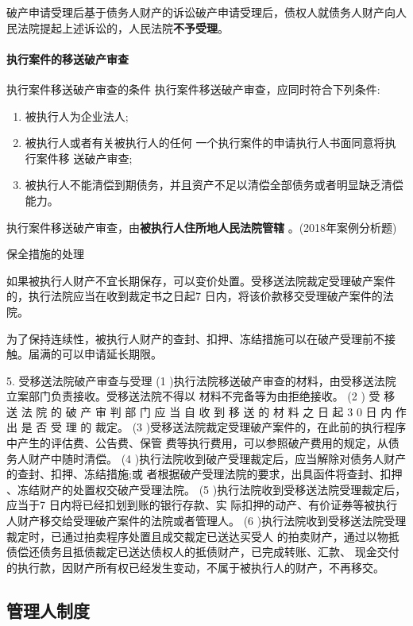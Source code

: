 \documentclass[UTF8,12pt]{ctexart}
\numberwithin{equation}{section} %
\numberwithin{figure}{section}
\numberwithin{table}{section}
\begin{document}
	破产申请受理后基于债务人财产的诉讼破产申请受理后，债权人就债务人财产向人民法院提起上述诉讼的，人民法院\textbf{不予受理}。
	
	\paragraph{执行案件的移送破产审查}
	执行案件移送破产审查的条件 执行案件移送破产审查，应同时符合下列条件:
	\begin{enumerate}
		\item 被执行人为企业法人;
		
		\item 被执行人或者有关被执行人的任何 一个执行案件的申请执行人书面同意将执行案件移 送破产审查;
		
		\item 被执行人不能清偿到期债务，并且资产不足以清偿全部债务或者明显缺乏清偿能力。 
	\end{enumerate}
	
	执行案件移送破产审查，由\textbf{被执行人住所地人民法院管辖} 。(2018年案例分析题)
	
	保全措施的处理
	
	如果被执行人财产不宜长期保存，可以变价处置。受移送法院裁定受理破产案件 的，执行法院应当在收到裁定书之日起7 日内，将该价款移交受理破产案件的法院。
	
	为了保持连续性，被执行人财产的查封、扣押、冻结措施可以在破产受理前不接触。届满的可以申请延长期限。 
	
	5. 受移送法院破产审查与受理
	(1 )执行法院移送破产审查的材料，由受移送法院立案部门负责接收。受移送法院不得以 材料不完备等为由拒绝接收。
	(2 ) 受 移 送 法 院 的 破 产 审 判 部 门 应 当 自 收 到 移 送 的 材 料 之 日 起 3 0 日 内 作 出 是 否 受 理 的
	裁定。
	(3 )受移送法院裁定受理破产案件的，在此前的执行程序中产生的评估费、公告费、保管 费等执行费用，可以参照破产费用的规定，从债务人财产中随时清偿。
	(4 )执行法院收到破产受理裁定后，应当解除对债务人财产的查封、扣押、冻结措施;或 者根据破产受理法院的要求，出具函件将查封、扣押 、冻结财产的处置权交破产受理法院。
	 (5 )执行法院收到受移送法院受理裁定后，应当于7 日内将已经扣划到账的银行存款、实 际扣押的动产、有价证券等被执行人财产移交给受理破产案件的法院或者管理人。
	(6 )执行法院收到受移送法院受理裁定时，已通过拍卖程序处置且成交裁定已送达买受人 的拍卖财产，通过以物抵债偿还债务且抵债裁定已送达债权人的抵债财产，已完成转账、汇款、 现金交付的执行款，因财产所有权已经发生变动，不属于被执行人的财产，不再移交。

	
	\subsection{管理人制度}
\end{document}
